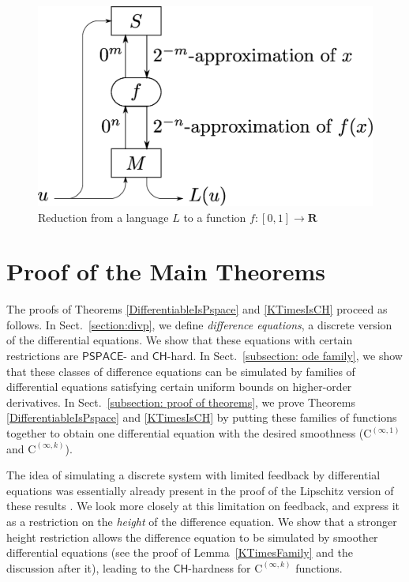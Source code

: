 \documentclass[12pt,a4paper]{article}
\theoremstyle{definition}
\theoremstyle{remark}
\newcommand{\R}{\mathbf R}
\newcommand{\classPSPACE}{\mathsf{PSPACE}}
\newcommand{\classCH}{\mathsf{CH}}
\newcommand{\classC}{\mathrm C}
\begin{document}
 \begin{figure}
  \begin{center}
  \includegraphics[scale=0.25]{image/reduction.eps}
  \caption{Reduction from a language $L$ to a function $f \colon [0,1] \to \R$}
  \label{fig:reduction}
  \end{center}
 \end{figure}


\section{Proof of the Main Theorems}
\label{section:differentiable}

The proofs of Theorems \ref{DifferentiableIsPspace} and \ref{KTimesIsCH}
proceed as follows. 
In Sect.~\ref{section:divp}, 
we define \emph{difference equations}, 
a discrete version of the differential equations. 
We show that these equations with certain restrictions 
are $\classPSPACE$- and $\classCH$-hard. 
In Sect.~\ref{subsection: ode family}, 
we show that these classes of difference equations can be simulated
by families of differential equations 
satisfying certain uniform bounds on higher-order derivatives. 
In Sect.~\ref{subsection: proof of theorems}, 
we prove Theorems \ref{DifferentiableIsPspace} and \ref{KTimesIsCH} by
putting these families of functions together 
to obtain one differential equation 
with the desired smoothness 
($\classC ^{(\infty, 1)}$ and $\classC ^{(\infty, k)}$). 

The idea of simulating a discrete system with limited feedback 
by differential equations
was essentially already present in the proof of 
the Lipschitz version of these results \cite{kawamura2010lipschitz}. 
We look more closely at this limitation on feedback, 
and express it as a restriction on the \emph{height}
of the difference equation. 
We show that a stronger height restriction allows
the difference equation to be simulated by 
smoother differential equations 
(see the proof of Lemma~\ref{KTimesFamily} and the discussion after it), 
leading to the $\classCH$-hardness for $\classC ^{(\infty, k)}$ functions.
\end{document}
